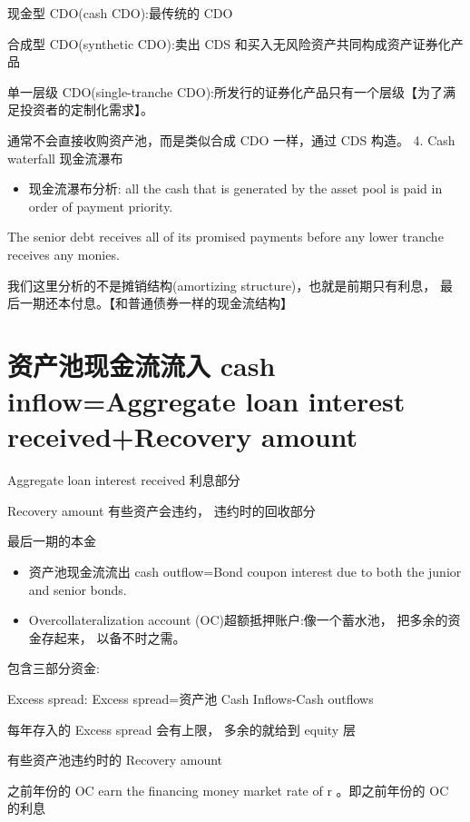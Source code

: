  现金型 CDO(cash CDO):最传统的 CDO

合成型 CDO(synthetic CDO):卖出 CDS 和买入无风险资产共同构成资产证券化产品

 单一层级 CDO(single-tranche CDO):所发行的证券化产品只有一个层级【为了满足投资者的定制化需求】。

通常不会直接收购资产池，而是类似合成 CDO 一样，通过 CDS 构造。 4. Cash waterfall 现金流瀑布

\begin{itemize}
\item 现金流瀑布分析: all the cash that is generated by the asset pool is paid in order of payment priority.
\end{itemize}

The senior debt receives all of its promised payments before any lower tranche receives any monies.

我们这里分析的不是摊销结构(amortizing structure)，也就是前期只有利息， 最后一期还本付息。【和普通债券一样的现金流结构】

\section*{资产池现金流流入 cash inflow=Aggregate loan interest received+Recovery amount}

Aggregate loan interest received 利息部分

Recovery amount 有些资产会违约， 违约时的回收部分

最后一期的本金

\begin{itemize}
\item 资产池现金流流出 cash outflow=Bond coupon interest due to both the junior and senior bonds.
\end{itemize}

\begin{itemize}
\item Overcollateralization account (OC)超额抵押账户:像一个蓄水池， 把多余的资金存起来， 以备不时之需。
\end{itemize}

包含三部分资金:

Excess spread: Excess spread=资产池 Cash Inflows-Cash outflows

每年存入的 Excess spread 会有上限， 多余的就给到 equity 层

有些资产池违约时的 Recovery amount

之前年份的 OC earn the financing money market rate of \(\mathrm{r}\) 。即之前年份的 OC 的利息

